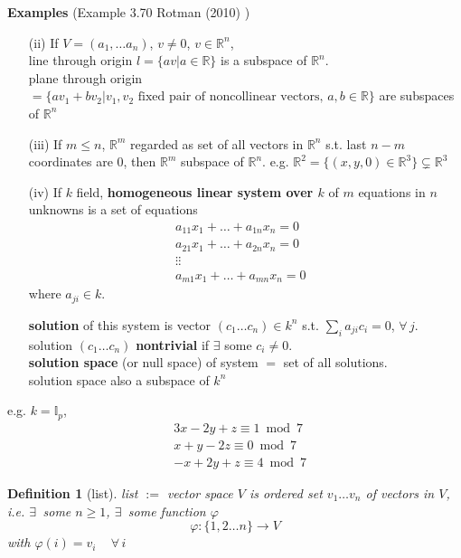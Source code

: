 \documentclass[10pt]{amsart}
\newtheorem{definition}{Definition}
\begin{document}
\begin{multicols*}{2}
\textbf{Examples} (Example 3.70 Rotman (2010) \cite{JRotman2010}) 
\begin{enumerate}
	\item[(ii)] If $V=(a_1, \dots a_n)$, $v\neq 0$, $v\in \mathbb{R}^n$, \\
	line through origin $l = \lbrace av | a \in \mathbb{R} \rbrace$ is a subspace of $\mathbb{R}^n$. \\
	plane through origin $=\lbrace av_1 + bv_2 | v_1 , v_2 \text{ fixed pair of noncollinear vectors, } a,b \in \mathbb{R} \rbrace$ are subspaces of $\mathbb{R}^n$
	\item[(iii)] If $m\leq n$, $\mathbb{R}^m$ regarded as set of all vectors in $\mathbb{R}^n$ s.t. last $n-m$ coordinates are $0$, then $\mathbb{R}^m$ subspace of $\mathbb{R}^n$.
	e.g. $\mathbb{R}^2 = \lbrace (x,y,0) \in \mathbb{R}^3 \rbrace \subsetneq \mathbb{R}^3$
	\item[(iv)] If $k$ field, \textbf{homogeneous linear system over $k$ } of $m$ equations in $n$ unknowns is a set of equations
	\[
	\begin{aligned}
	a_{11} x_1 + \dots + a_{1n} x_n = 0 & \\
	a_{21} x_1 + \dots + a_{2n} x_n = 0 & \\
	\vdots \vdots & \\
		a_{m1} x_1 + \dots + a_{mn} x_n = 0 & 
	\end{aligned}
	\] 
	where $a_{ji} \in k$.
	
	\textbf{solution} of this system is vector $(c_1 \dots c_n) \in k^n$ s.t. $\sum_i a_{ji} c_i  =0$, $\forall \, j$. \\
	solution $(c_1 \dots c_n)$ \textbf{nontrivial} if $\exists$ some $c_i \neq 0$. \\
	\textbf{solution space} (or null space) of system $=$ set of all solutions. \\
	solution space also a subspace of $k^n$
\end{enumerate}

e.g. $k = \mathbb{I}_p$, 
\[
\begin{aligned}
& 3x - 2y + z \equiv 1 \bmod{7} \\
& x + y -2 z \equiv 0 \bmod{7} \\
& -x + 2y + z \equiv 4 \bmod{7}
\end{aligned}
\]
\begin{definition}[list]
	list $:=$ vector space $V$ is ordered set $v_1 \dots v_n$ of vectors in $V$, i.e. 
	$\exists \, $ some $n\geq 1$, $\exists \, $ some function $\varphi$ 
	\[
	\varphi : \lbrace 1,2\dots n \rbrace \to V
	\]
	with $\varphi(i) = v_i \quad \, \forall \, i$
\end{definition}


\end{multicols*}
\end{document}
